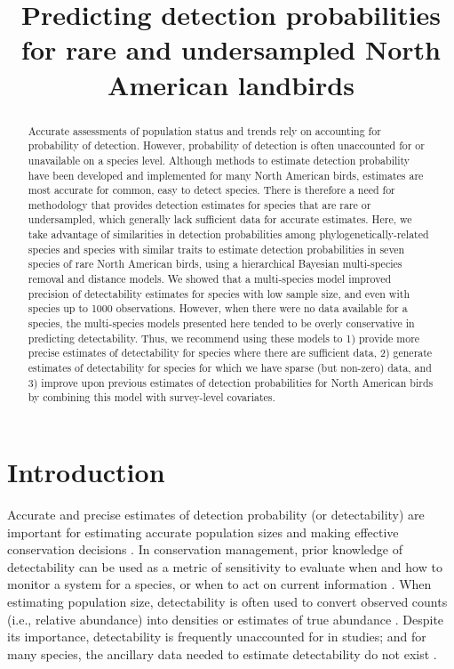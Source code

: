 \documentclass[12pt]{article}
\title{Predicting detection probabilities for rare and undersampled North American landbirds}
\date{}
\begin{document}
\maketitle

\begin{abstract}
	
	Accurate assessments of population status and trends rely on accounting for probability of detection.
	However, probability of detection is often unaccounted for or unavailable on a species level. 
	Although methods to estimate detection probability have been developed and implemented for many North American birds, estimates are most accurate for common, easy to detect species. 
	There is therefore a need for methodology that provides detection estimates for species that are rare or undersampled, which generally lack sufficient data for accurate estimates. 
	Here, we take advantage of similarities in detection probabilities among phylogenetically-related species and species with similar traits to estimate detection probabilities in seven species of rare North American birds, using a hierarchical Bayesian multi-species removal and distance models. 
	We showed that a multi-species model improved precision of detectability estimates for species with low sample size, and even with species up to 1000 observations.
	However, when there were no data available for a species, the multi-species models presented here tended to be overly conservative in predicting detectability. 
	Thus, we recommend using these models to 1) provide more precise estimates of detectability for species where there are sufficient data, 2) generate estimates of detectability for species for which we have sparse (but non-zero) data, and 3) improve upon previous estimates of detection probabilities for North American birds by combining this model with survey-level covariates.

\end{abstract}

\section{Introduction}

\par Accurate and precise estimates of detection probability (or detectability) are important for estimating accurate population sizes and making effective conservation decisions \citep{bennett_how_2024}.
In conservation management, prior knowledge of detectability can be used as a metric of sensitivity to evaluate when and how to monitor a system for a species, or when to act on current information \citep{canessa_when_2015, bennett_when_2018}. 
When estimating population size, detectability is often used to convert observed counts (i.e., relative abundance) into densities or estimates of true abundance \citep{solymos_calibrating_2013, johnson_defense_2008}.
Despite its importance, detectability is frequently unaccounted for in studies; and for many species, the ancillary data needed to estimate detectability do not exist \citep{bennett_how_2024}.
\end{document}

